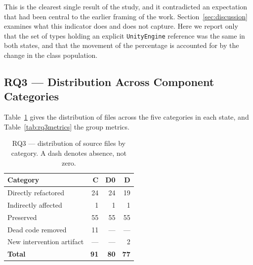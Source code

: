 \documentclass{sbc2019}%
\begin{document}
This is the clearest single result of the study, and it contradicted an
expectation that had been central to the earlier framing of the work.
Section~\ref{sec:discussion} examines what this indicator does and does not
capture. Here we report only that the set of types holding an explicit
\texttt{UnityEngine} reference was the same in both states, and that the movement
of the percentage is accounted for by the change in the class population.

\subsection{RQ3 --- Distribution Across Component Categories}\label{sec:rq3}

Table~\ref{tab:rq3dist} gives the distribution of files across the five
categories in each state, and Table~\ref{tab:rq3metrics} the group metrics.

\begin{table}[!htbp]
\centering
\caption{RQ3 --- distribution of source files by category. A dash denotes
absence, not zero.}\label{tab:rq3dist}
\small
\begin{tabular}{lrrr}
\toprule
\textbf{Category} & \textbf{C} & \textbf{D0} & \textbf{D} \\
\midrule
Directly refactored        & 24 & 24 & 19 \\
Indirectly affected        & 1  & 1  & 1 \\
Preserved                  & 55 & 55 & 55 \\
Dead code removed          & 11 & ---& --- \\
New intervention artifact  & ---& ---& 2 \\
\midrule
\textbf{Total}             & \textbf{91} & \textbf{80} & \textbf{77} \\
\bottomrule
\end{tabular}
\end{table}
\end{document}
